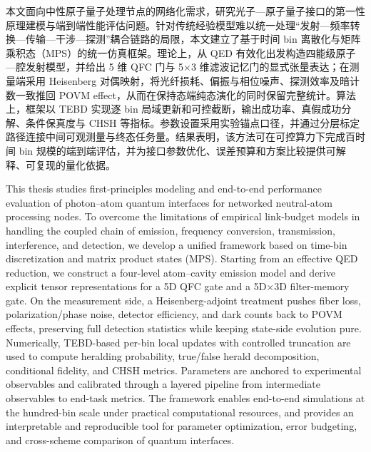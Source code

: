 
\begin{cabstract}
本文面向中性原子量子处理节点的网络化需求，研究光子—原子量子接口的第一性原理建模与端到端性能评估问题。针对传统经验模型难以统一处理“发射—频率转换—传输—干涉—探测”耦合链路的局限，本文建立了基于时间 bin 离散化与矩阵乘积态（MPS）的统一仿真框架。理论上，从 QED 有效化出发构造四能级原子—腔发射模型，并给出 5 维 QFC 门与 5×3 维滤波记忆门的显式张量表达；在测量端采用 Heisenberg 对偶映射，将光纤损耗、偏振与相位噪声、探测效率及暗计数一致推回 POVM effect，从而在保持态端纯态演化的同时保留完整统计。算法上，框架以 TEBD 实现逐 bin 局域更新和可控截断，输出成功率、真假成功分解、条件保真度与 CHSH 等指标。参数设置采用实验锚点口径，并通过分层标定路径连接中间可观测量与终态任务量。结果表明，该方法可在可控算力下完成百时间 bin 规模的端到端评估，并为接口参数优化、误差预算和方案比较提供可解释、可复现的量化依据。
\end{cabstract}

\begin{eabstract}
This thesis studies first-principles modeling and end-to-end performance evaluation of photon--atom quantum interfaces for networked neutral-atom processing nodes. To overcome the limitations of empirical link-budget models in handling the coupled chain of emission, frequency conversion, transmission, interference, and detection, we develop a unified framework based on time-bin discretization and matrix product states (MPS). Starting from an effective QED reduction, we construct a four-level atom--cavity emission model and derive explicit tensor representations for a 5D QFC gate and a 5D$\times$3D filter-memory gate. On the measurement side, a Heisenberg-adjoint treatment pushes fiber loss, polarization/phase noise, detector efficiency, and dark counts back to POVM effects, preserving full detection statistics while keeping state-side evolution pure. Numerically, TEBD-based per-bin local updates with controlled truncation are used to compute heralding probability, true/false herald decomposition, conditional fidelity, and CHSH metrics. Parameters are anchored to experimental observables and calibrated through a layered pipeline from intermediate observables to end-task metrics. The framework enables end-to-end simulations at the hundred-bin scale under practical computational resources, and provides an interpretable and reproducible tool for parameter optimization, error budgeting, and cross-scheme comparison of quantum interfaces.
\end{eabstract} 
